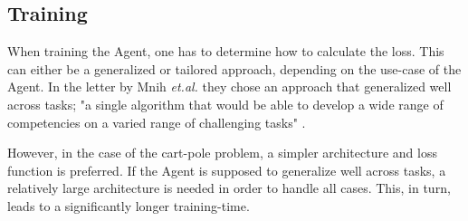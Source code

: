 \documentclass{article}
\renewenvironment{leftbar}[1][\hsize]{
    \def\FrameCommand{{\color{barcolor}\vrule width 2pt \hspace{10pt}}}
    \MakeFramed{\hsize#1 \advance\hsize-\width \FrameRestore}
}{\endMakeFramed}
\begin{document}
\subsection*{Training}
\begin{leftbar}
    When training the Agent, one has to determine how to calculate the loss. This can either be a generalized or tailored approach, depending on the use-case of the Agent. In the letter by Mnih \textit{et.al.} they chose an approach that generalized well across tasks; "a single algorithm that would be able to develop a wide range of competencies on a varied range of challenging tasks" \cite{Human-level}. 
    
    However, in the case of the cart-pole problem, a simpler architecture and loss function is preferred. If the Agent is supposed to generalize well across tasks, a relatively large architecture is needed in order to handle all cases. This, in turn, leads to a significantly longer training-time.
\end{leftbar}


\newpage
\printbibliography
\end{document}
